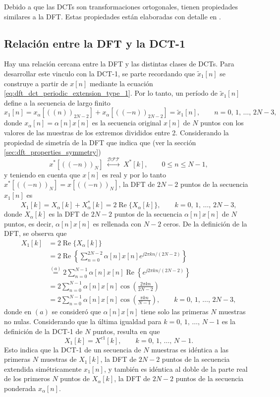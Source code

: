 \documentclass[a4paper]{report}
\renewcommand{\Re}{\operatorname{Re}}
\begin{document}
Debido a que las DCTs son transformaciones ortogonales, tienen propiedades similares a la DFT. Estas propiedades están elaboradas con detalle en \cite{rao1990discrete}.

\subsection{Relación entre la DFT y la DCT-1}

Hay una relación cercana entre la DFT y las distintas clases de DCTs. Para desarrollar este vinculo con la DCT-1, se parte recordando que \(\tilde{x}_1[n]\) se construye a partir de \(x[n]\) mediante la ecuación \ref{eq:dft_dct_periodic_extension_type_1}. Por lo tanto, un período de \(\tilde{x}_1[n]\) define a la secuencia de largo finito 
\[
 x_1[n]=x_\alpha[((n))_{2N-2}]+x_\alpha[((-n))_{2N-2}]=\tilde{x}_1[n],
 \qquad 
 n=0,\,1,\,\dots,\,2N-3,
\]
donde \(x_\alpha[n]=\alpha[n]x[n]\) es la secuencia original \(x[n]\) de \(N\) puntos con los valores de las muestras de los extremos divididos entre 2. Considerando la propiedad de simetría de la DFT que indica que (ver la sección \ref{sec:dft_properties_symmetry})
\[
 x^*[((-n))_N]\;\overset{\mathcal{DFT}}{\longleftrightarrow}\;{X}^*[k],
 \qquad 0\leq n\leq N-1,
\]
y teniendo en cuenta que \(x[n]\) es real y por lo tanto \(x^*[((-n))_N]=x[((-n))_N]\), la DFT de \(2N-2\) puntos de la secuencia \(x_1[n]\) es
\[
 X_1[k]=X_\alpha[k]+X^*_\alpha[k]=2\Re\{X_\alpha[k]\},
 \qquad 
 k=0,\,1,\,\dots,\,2N-3,
\]
donde \(X_\alpha[k]\) es la DFT de \(2N-2\) puntos de la secuencia \(\alpha[n]x[n]\) de \(N\) puntos, es decir, \(\alpha[n]x[n]\) es rellenada con \(N-2\) ceros. De la definición de la DFT, se observa que 
\begin{align*}
 X_1[k]&=2\Re\{X_\alpha[k]\}\\
  &=2\Re\left\{\sum_{n=0}^{2N-2}\alpha[n]x[n]e^{j2\pi kn/(2N-2)}\right\}\\
  &\overset{(a)}{=}2\sum_{n=0}^{N-1}\alpha[n]x[n]\Re\left\{e^{j2\pi kn/(2N-2)}\right\}\\
  &=2\sum_{n=0}^{N-1}\alpha[n]x[n]\cos\left(\frac{2\pi kn}{2N-2}\right)\\
  &=2\sum_{n=0}^{N-1}\alpha[n]x[n]\cos\left(\frac{\pi kn}{N-1}\right),
  \qquad
  k=0,\,1,\,\dots,\,2N-3,
\end{align*}
donde en \((a)\) se consideró que \(\alpha[n]x[n]\) tiene solo las primeras \(N\) muestras no nulas. Considerando que la última igualdad para \(k=0,\,1,\,\dots,\,N-1\) es la definición de la DCT-1 de \(N\) puntos, resulta en que 
\begin{equation}\label{eq:dft_dct_1_relation_with_dft_X1}
 X_1[k]=X^{c1}[k],
  \qquad
  k=0,\,1,\,\dots,\,N-1.
\end{equation}
Esto indica que la DCT-1 de un secuencia de \(N\) muestras es idéntica a las primeras \(N\) muestras de \(X_1[k]\), la DFT de \(2N-2\) puntos de la secuencia extendida simétricamente \(x_1[n]\), y también es idéntica al doble de la parte real de los primeros \(N\) puntos de \(X_\alpha[k]\), la DFT de \(2N-2\) puntos de la secuencia ponderada \(x_\alpha[n]\).
\end{document}
